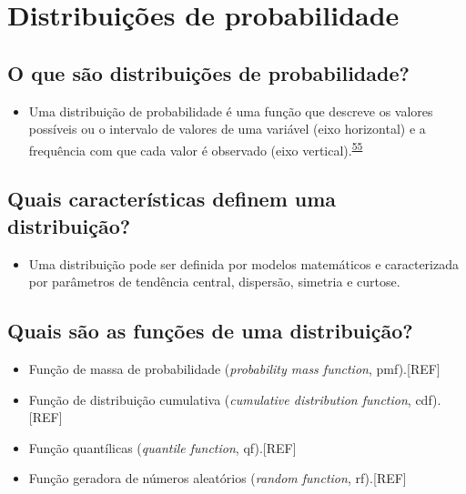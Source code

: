 \documentclass[
  a4paper,
]{book}
\providecommand{\tightlist}{%
  \setlength{\itemsep}{0pt}\setlength{\parskip}{0pt}}
\begin{document}
\hypertarget{distribuicoes}{%
\section{Distribuições de probabilidade}\label{distribuicoes}}

\hypertarget{o-que-suxe3o-distribuiuxe7uxf5es-de-probabilidade}{%
\subsection{O que são distribuições de probabilidade?}\label{o-que-suxe3o-distribuiuxe7uxf5es-de-probabilidade}}

\begin{itemize}
\tightlist
\item
  Uma distribuição de probabilidade é uma função que descreve os valores possíveis ou o intervalo de valores de uma variável (eixo horizontal) e a frequência com que cada valor é observado (eixo vertical).\textsuperscript{\protect\hyperlink{ref-vetter2017}{55}}
\end{itemize}

\hypertarget{quais-caracteruxedsticas-definem-uma-distribuiuxe7uxe3o}{%
\subsection{Quais características definem uma distribuição?}\label{quais-caracteruxedsticas-definem-uma-distribuiuxe7uxe3o}}

\begin{itemize}
\tightlist
\item
  Uma distribuição pode ser definida por modelos matemáticos e caracterizada por parâmetros de tendência central, dispersão, simetria e curtose.
\end{itemize}

\hypertarget{quais-suxe3o-as-funuxe7uxf5es-de-uma-distribuiuxe7uxe3o}{%
\subsection{Quais são as funções de uma distribuição?}\label{quais-suxe3o-as-funuxe7uxf5es-de-uma-distribuiuxe7uxe3o}}

\begin{itemize}
\item
  Função de massa de probabilidade (\emph{probability mass function}, pmf).{[}REF{]}
\item
  Função de distribuição cumulativa (\emph{cumulative distribution function}, cdf).{[}REF{]}
\item
  Função quantílicas (\emph{quantile function}, qf).{[}REF{]}
\item
  Função geradora de números aleatórios (\emph{random function}, rf).{[}REF{]}
\end{itemize}
\end{document}
